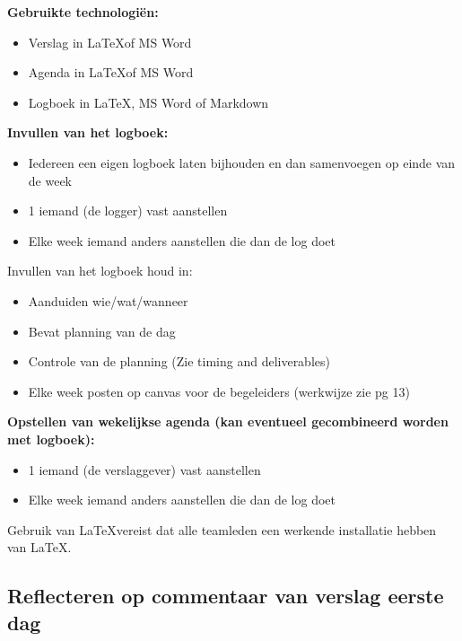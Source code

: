 \textbf{Gebruikte technologi\"en:}
\begin{itemize}
	\item Verslag in \LaTeX of MS Word
	\item Agenda in \LaTeX of MS Word
	\item Logboek in \LaTeX, MS Word of Markdown
\end{itemize}

\textbf{Invullen van het logboek:} 
\begin{itemize}
	\item Iedereen een eigen logboek laten bijhouden en dan samenvoegen op einde
		van de week
	\item 1 iemand (de logger) vast aanstellen
	\item Elke week iemand anders aanstellen die dan de log doet
\end{itemize}

Invullen van het logboek houd in:
\begin{itemize}
	\item Aanduiden wie/wat/wanneer
	\item Bevat planning van de dag
	\item Controle van de planning (Zie timing and deliverables)
	\item Elke week posten op canvas voor de begeleiders (werkwijze zie pg 13)
\end{itemize}

\textbf{Opstellen van wekelijkse agenda (kan eventueel gecombineerd worden met
logboek):} 
\begin{itemize}
	\item 1 iemand (de verslaggever) vast aanstellen
	\item Elke week iemand anders aanstellen die dan de log doet
\end{itemize}

\Opm Gebruik van \LaTeX vereist dat alle teamleden een werkende installatie hebben
van \LaTeX.

\subsection{Reflecteren op commentaar van verslag eerste dag}%
\label{sub:Reflecteren op commentaar van verslag eerste dag}


